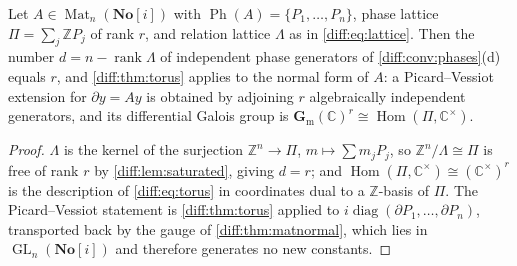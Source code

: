 \documentclass[11pt,letterpaper]{article}
\numberwithin{equation}{section}
\theoremstyle{definition}
\theoremstyle{remark}
\newcommand{\SC}{\mathbf{No}[i]}
\newcommand{\C}{\mathbb C}
\newcommand{\Z}{\mathbb Z}
\newcommand{\der}{\partial}
\newcommand{\Mat}{\operatorname{Mat}}
\newcommand{\GL}{\operatorname{GL}}
\newcommand{\gm}{\mathbf G_{\mathrm m}}
\newcommand{\Hom}{\operatorname{Hom}}
\newcommand{\Ph}{\operatorname{Ph}}
\begin{document}
\begin{corollary}
\label{diff:cor:mattorus}
Let $A\in\Mat_{n}(\SC)$ with $\Ph(A)=\{P_{1},\dots,P_{n}\}$, phase lattice
$\Pi=\sum_{j}\Z P_{j}$ of rank $r$, and relation lattice $\Lambda$ as in
\cref{diff:eq:lattice}. Then the number $d=n-\operatorname{rank}\Lambda$ of
independent phase generators of \cref{diff:conv:phases}(d) equals $r$, and
\cref{diff:thm:torus} applies to the normal form of $A$: a Picard--Vessiot
extension for $\der y=Ay$ is obtained by adjoining $r$ algebraically
independent generators, and its differential Galois group is
$\gm(\C)^{r}\cong\Hom(\Pi,\C^{\times})$.
\end{corollary}
\begin{proof}
$\Lambda$ is the kernel of the surjection $\Z^{n}\to\Pi$,
$m\mapsto\sum m_{j}P_{j}$, so $\Z^{n}/\Lambda\cong\Pi$ is free of rank $r$ by
\cref{diff:lem:saturated}, giving $d=r$; and
$\Hom(\Pi,\C^{\times})\cong(\C^{\times})^{r}$ is the description of
\cref{diff:eq:torus} in coordinates dual to a $\Z$-basis of $\Pi$. The
Picard--Vessiot statement is \cref{diff:thm:torus} applied to
$i\operatorname{diag}(\der P_{1},\dots,\der P_{n})$, transported back by the
gauge of \cref{diff:thm:matnormal}, which lies in $\GL_{n}(\SC)$ and therefore
generates no new constants.
\end{proof}
\end{document}
